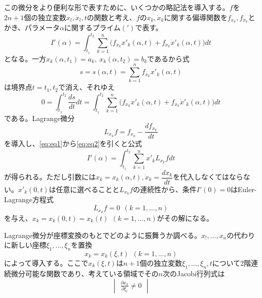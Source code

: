\documentclass[dvipdfmx, leqno]{jsbook}
\begin{document}
    この微分をより便利な形で表すために、いくつかの略記法を導入する。$f$を$2n+ 1$個の独立変数$x_l, \dot{x}_l, t$の関数と考え、$f$の$x_k, \dot{x}_k$に関する偏導関数を$f_{x_k}, f_{\dot{x}_k}$とかき、パラメータ$\alpha$に関するプライム$(')$で表す。
\begin{equation} \label{eq:eq1}
    I'(\alpha)= \int_{t_1}^{t_2} \sum_{k= 1}^n \Big(f_{x_k}x'_k(\alpha, t)+ f_{\dot{x}_k}\dot{x}'_k(\alpha, t)\Big) dt
\end{equation}
    となる。一方$x_k(\alpha, t_1)= a_k,\ x_k(\alpha, t_2)= b_k$であるから式
\begin{equation}
    s= s(\alpha, t)= \sum_{k= 1}^n f_{\dot{x}_k}x'_k(\alpha, t)
\end{equation}
    は境界点$t= t_1, t_2$で消え、それゆえ
\begin{equation} \label{eq:eq2}
    0= \int_{t_1}^{t_2} \frac{ds}{dt}dt= \int_{t_1}^{t_2} \sum_{k= 1}^n \Big(f_{x_k}x'_k(\alpha, t)+ f_{\dot{x}_k}\dot{x}'_k(\alpha, t)\Big) dt
\end{equation}
    である。Lagrange微分
\begin{equation}
    L_{x_k}f= f_{x_k}- \frac{df_{\dot{x}_k}}{dt}
\end{equation}
    を導入し、\eqref{eq:eq1}から\eqref{eq:eq2}を引くと公式
\begin{equation}
    I'(\alpha)= \int_{t_1}^{t_2} \sum_{k= 1}^n x'_kL_{x_k}f dt
\end{equation}
    が得られる。ただし引数には$x_k= x_k(\alpha, t), \dot{x}_k= \dfrac{dx_k}{dt}$を代入しなくてはならない。$x'_k(0, t)$は任意に選べることと$L_{x_k}f$の連続性から、条件$I'(0)= 0$はEuler-Lagrange方程式
\begin{equation}
    L_{x_k}f= 0\ \ (k= 1, \ldots, n)
\end{equation}
    を与え、$x_k= x_k(0, t)= x_k(t)\ \ (k= 1, \ldots, n)$がその解になる。

    Lagrange微分が座標変換のもとでどのように振舞うか調べる。$x_!, \ldots, x_n$の代わりに新しい座標$\xi_1, \ldots, \xi_n$を置換
\begin{equation} \label{eq:eq3}
    x_k= x_k(\xi, t)\ \ (k= 1, \ldots, n)
\end{equation}
    によって導入する。ここで$x_k(\xi, t)$は$n+ 1$個の独立変数$\xi_1, \ldots, \xi_n, t$について2階連続微分可能な関数であり、考えている領域でその$n$次のJacobi行列式は
\begin{equation}
    \begin{vmatrix}
    \frac{\partial x_k}{\partial \xi_l}\ne 0
    \end{vmatrix}
\end{equation}
\end{document}
